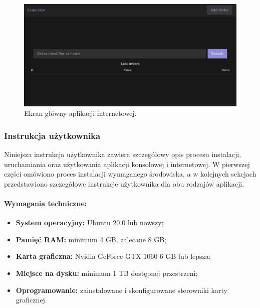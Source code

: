                 \begin{figure}[!htb]
                    \begin{center}
                        \includegraphics[width=\textwidth]{tex/pictures/app/web_screen.png}
                    \end{center}
                    \caption{
                        Ekran główny aplikacji internetowej.
                    }\label{Picture:App:WebScreen}
                \end{figure}

        \subsubsection{Instrukcja użytkownika}

            Niniejsza instrukcja użytkownika zawiera szczegółowy opis procesu instalacji, uruchamiania oraz użytkowania aplikacji konsolowej i internetowej. W pierwszej części omówiono proces instalacji wymaganego środowiska, a w kolejnych sekcjach przedstawiono szczegółowe instrukcje użytkownika dla obu rodzajów aplikacji.

            \paragraph{Wymagania techniczne:}
                \begin{itemize}
                    \item {
                        \textbf{System operacyjny:} Ubuntu 20.0 lub nowszy;
                    }
                    \item {
                        \textbf{Pamięć RAM:} minimum 4 GB, zalecane 8 GB;
                    }
                    \item {
                        \textbf{Karta graficzna:} Nvidia GeForce GTX 1060 6 GB lub lepsza;
                    }
                    \item {
                        \textbf{Miejsce na dysku:} minimum 1 TB dostępnej przestrzeni;
                    }
                    \item {
                        \textbf{Oprogramowanie:} zainstalowane i skonfigurowane sterowniki karty graficznej.
                    }
                \end{itemize}

